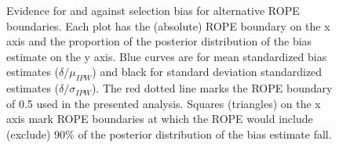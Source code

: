 \documentclass[]{article}
\begin{document}
\begin{figure}[ht]
	\centering 
	\caption{Evidence for and against selection bias for alternative ROPE boundaries. Each plot has the (absolute) ROPE boundary on the x axis and the proportion of the posterior distribution of the bias estimate on the y axis. Blue curves are for mean standardized bias estimates ($\delta/\mu_{IPW}$) and black for standard deviation standardized estimates ($\delta/\sigma_{IPW}$). The red dotted line marks the ROPE boundary of 0.5 used in the presented analysis. Squares (triangles) on the x axis mark ROPE boundaries at which the ROPE would include (exclude) 90\% of the posterior distribution of the bias estimate fall.}
	\label{fig:ropeplots}
\end{figure}
\end{document}
